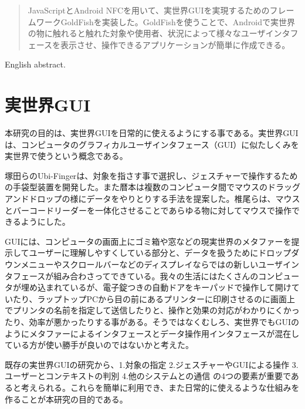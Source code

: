 
\begin{abstract}
JavaScriptとAndroid NFCを用いて、実世界GUIを実現するためのフレームワークGoldFishを実装した。GoldFishを使うことで、Androidで実世界の物に触れると触れた対象や使用者、状況によって様々なユーザインタフェースを表示させ、操作できるアプリケーションが簡単に作成できる。
\end{abstract}

\begin{eabstract}
English abstract.
\end{eabstract}

\maketitle

\section{実世界GUI}\label{sec:Introduction}
本研究の目的は、実世界GUI\cite{実世界GUI}を日常的に使えるようにする事である。実世界GUIは、コンピュータのグラフィカルユーザインタフェース（GUI）に似たしくみを実世界で使うという概念である。

塚田らのUbi-Finger\cite{Ubi-Finger}は、対象を指さす事で選択し、ジェスチャーで操作するための手袋型装置を開発した。また暦本は複数のコンピュータ間でマウスのドラッグアンドドロップの様にデータをやりとりする手法\cite{pick-and-drop}を提案した。椎尾らは、マウスとバーコードリーダーを一体化させることであらゆる物に対してマウスで操作できるようにした。\cite{field-mouse}

GUIには、コンピュータの画面上にゴミ箱や窓などの現実世界のメタファーを提示してユーザーに理解しやすくしている部分と、データを扱うためにドロップダウンメニューやスクロールバーなどのディスプレイならではの新しいユーザインタフェースが組み合わさってできている。我々の生活にはたくさんのコンピュータが埋め込まれているが、電子錠つきの自動ドアをキーパッドで操作して開けていたり、ラップトップPCから目の前にあるプリンターに印刷させるのに画面上でプリンタの名前を指定して送信したりと、操作と効果の対応がわかりにくかったり、効率が悪かったりする事がある。そうではなくむしろ、実世界でもGUIのようにメタファーによるインタフェースとデータ操作用インタフェースが混在している方が使い勝手が良いのではないかと考えた。

既存の実世界GUIの研究から、1.対象の指定 2.ジェスチャーやGUIによる操作 3.ユーザーとコンテキストの判別 4.他のシステムとの通信 の4つの要素が重要であると考えられる。これらを簡単に利用でき、また日常的に使えるような仕組みを作ることが本研究の目的である。


